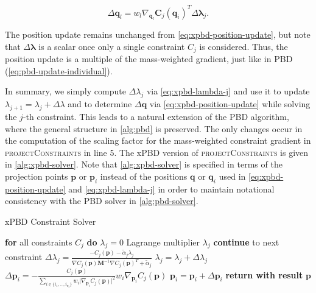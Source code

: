 \begin{equation}\label{eq:xpbd-position-update-i}
    \Delta \bm{q}_l = w_l \nabla_{\bm{q}_l} \bm{C}_j(\bm{q}_i)^T \Delta \bm{\lambda}_j.
\end{equation}

\noindent The position update remains unchanged from \cref{eq:xpbd-position-update}, but note that $\Delta \bm{\lambda}$ is a scalar once only a single constraint 
$C_j$ is considered. Thus, the position update is a multiple of the mass-weighted gradient, just like in PBD (\cref{eq:pbd-update-individual}).

In summary, we simply compute $\Delta \lambda_j$ via \cref{eq:xpbd-lambda-j} and use it to 
update $\lambda_{j+1} = \lambda_j + \Delta \lambda$ and to determine $\Delta \bm{q}$ via \cref{eq:xpbd-position-update} while solving the $j$-th constraint. 
This leads to a natural extension of the PBD algorithm, where the general structure in \cref{alg:pbd} is preserved. The only changes occur in the 
computation of the scaling factor for the 
mass-weighted constraint gradient in \textsc{projectConstraints} in line 5. The xPBD version of \textsc{projectConstraints} is given in 
\cref{alg:xpbd-solver}. Note that \cref{alg:xpbd-solver} is specified in terms of the projection points $\bm{p}$ or $\bm{p}_i$ instead of the 
positions $\bm{q}$ or $\bm{q}_i$ used in \cref{eq:xpbd-position-update} and \cref{eq:xpbd-lambda-j} in order to maintain notational consistency with the
PBD solver in \cref{alg:pbd-solver}.

\begin{algorithm}
\caption{xPBD Constraint Solver}\label{alg:xpbd-solver}
\begin{algorithmic}[1]
\State \textbf{for} all constraints $C_j$ \textbf{do} $\lambda_j = 0$
\StatexIndent[3] Lagrange multiplier $\lambda_j$ \algorithmicdo
{}
\State \textbf{continue} to next constraint
\EndIf
\State $\Delta \lambda_j = \frac{-C_j(\bm{p}) - \tilde{\alpha}_j \lambda_{j}}{\nabla C_j(\bm{p}) \bm{M}^{-1} \nabla C_j(\bm{p})^T + \tilde{\alpha}_j}$
\State $\lambda_{j} = \lambda_{j} + \Delta \lambda_j$
\State $\Delta \bm{p}_i = -\frac{C_j(\bm{p})}{\sum_{i \in \{ i_1, \ldots, i_{n_j} \}} w_i \vert \nabla_{\bm{p}_i}C_j(\bm{p}) \vert^2 } w_i 
\nabla_{\bm{p}_i} C_j(\bm{p})$
\State $\bm{p}_i = \bm{p}_i + \Delta \bm{p}_i$
\EndFor
\EndFor
\EndFor
\State \textbf{return with result } $\bm{p}$
\EndProcedure
\end{algorithmic}
\end{algorithm}

